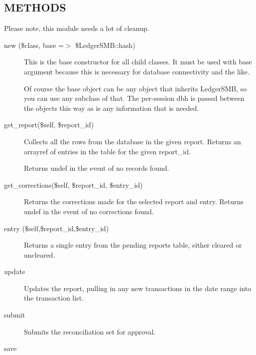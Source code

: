 \begin{description}
\begin{description}
\begin{description}
\begin{description}
\begin{description}
\begin{description}
\begin{description}
\begin{description}
\begin{description}
\subsection*{METHODS\label{LedgerSMB::DBObject::Reconciliation_METHODS}}


Please note, this module needs a lot of cleanup.

\begin{description}

\item[{new (\$class, base =$>$ \$LedgerSMB::hash)}] \mbox{}

This is the base constructor for all child classes.  It must be used with base
argument because this is necessary for database connectivity and the like.



Of course the base object can be any object that inherits LedgerSMB, so you can
use any subclass of that.  The per-session dbh is passed between the objects 
this way as is any information that is needed.


\item[{get\_report(\$self, \$report\_id)}] \mbox{}

Collects all the rows from the database in the given report. Returns an 
arrayref of entries in the table for the given report\_id.



Returns undef in the event of no records found.


\item[{get\_corrections(\$self, \$report\_id, \$entry\_id)}] \mbox{}

Returns the corrections made for the selected report and entry.
Returns undef in the event of no corrections found.


\item[{entry (\$self,\$report\_id,\$entry\_id)}] \mbox{}

Returns a single entry from the pending reports table, either cleared or
uncleared.


\item[{update}] \mbox{}

Updates the report, pulling in any new transactions in the date range into the 
transaction list.


\item[{submit}] \mbox{}

Submits the reconciliation set for approval.


\item[{save}] \mbox{}


\end{description}
\end{description}
\end{description}
\end{description}
\end{description}
\end{description}
\end{description}
\end{description}
\end{description}
\end{description}
